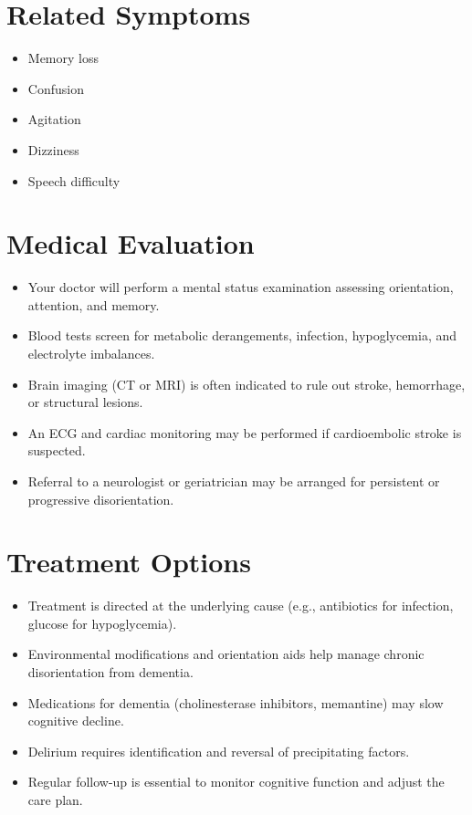 \section*{Related Symptoms}
\begin{itemize}
  \item Memory loss
  \item Confusion
  \item Agitation
  \item Dizziness
  \item Speech difficulty
\end{itemize}

\section*{Medical Evaluation}
\begin{itemize}
  \item Your doctor will perform a mental status examination assessing orientation, attention, and memory.
  \item Blood tests screen for metabolic derangements, infection, hypoglycemia, and electrolyte imbalances.
  \item Brain imaging (CT or MRI) is often indicated to rule out stroke, hemorrhage, or structural lesions.
  \item An ECG and cardiac monitoring may be performed if cardioembolic stroke is suspected.
  \item Referral to a neurologist or geriatrician may be arranged for persistent or progressive disorientation.
\end{itemize}

\section*{Treatment Options}
\begin{itemize}
  \item Treatment is directed at the underlying cause (e.g., antibiotics for infection, glucose for hypoglycemia).
  \item Environmental modifications and orientation aids help manage chronic disorientation from dementia.
  \item Medications for dementia (cholinesterase inhibitors, memantine) may slow cognitive decline.
  \item Delirium requires identification and reversal of precipitating factors.
  \item Regular follow-up is essential to monitor cognitive function and adjust the care plan.
\end{itemize}

